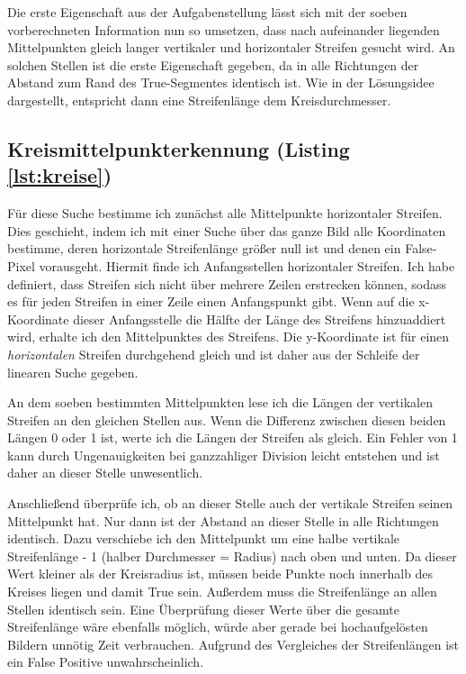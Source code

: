 Die erste Eigenschaft aus der Aufgabenstellung lässt sich mit der soeben vorberechneten Information nun so umsetzen, dass nach aufeinander liegenden Mittelpunkten gleich langer vertikaler und horizontaler Streifen gesucht wird.
An solchen Stellen ist die erste Eigenschaft gegeben, da in alle Richtungen der Abstand zum Rand des True-Segmentes identisch ist. Wie in der Lösungsidee dargestellt, entspricht dann eine Streifenlänge dem Kreisdurchmesser.

\subsection{Kreismittelpunkterkennung (Listing \ref{lst:kreise})}
Für diese Suche bestimme ich zunächst alle Mittelpunkte horizontaler Streifen. Dies geschieht, indem ich mit einer Suche über das ganze Bild alle Koordinaten bestimme, deren horizontale Streifenlänge größer null ist und denen ein False-Pixel vorausgeht.
Hiermit finde ich Anfangsstellen horizontaler Streifen. Ich habe definiert, dass Streifen sich nicht über mehrere Zeilen erstrecken können, sodass es für jeden Streifen in einer Zeile einen Anfangspunkt gibt.
Wenn auf die x-Koordinate dieser Anfangsstelle die Hälfte der Länge des Streifens hinzuaddiert wird, erhalte ich den Mittelpunktes des Streifens.
Die y-Koordinate ist für einen \textit{horizontalen} Streifen durchgehend gleich und ist daher aus der Schleife der linearen Suche gegeben.

An dem soeben bestimmten Mittelpunkten lese ich die Längen der vertikalen Streifen an den gleichen Stellen aus. Wenn die Differenz zwischen diesen beiden Längen 0 oder 1 ist, werte ich die Längen der Streifen als gleich.
Ein Fehler von 1 kann durch Ungenauigkeiten bei ganzzahliger Division leicht entstehen und ist daher an dieser Stelle unwesentlich.

Anschließend überprüfe ich, ob an dieser Stelle auch der vertikale Streifen seinen Mittelpunkt hat. Nur dann ist der Abstand an dieser Stelle in alle Richtungen identisch. Dazu verschiebe ich den Mittelpunkt um eine halbe vertikale Streifenlänge - 1 (halber Durchmesser = Radius) nach oben und unten. Da dieser Wert kleiner als der Kreisradius ist, müssen beide Punkte noch innerhalb des Kreises liegen und damit True sein. Außerdem muss die Streifenlänge an allen Stellen identisch sein.
Eine Überprüfung dieser Werte über die gesamte Streifenlänge wäre ebenfalls möglich, würde aber gerade bei hochaufgelösten Bildern unnötig Zeit verbrauchen. Aufgrund des Vergleiches der Streifenlängen ist ein False Positive unwahrscheinlich.

